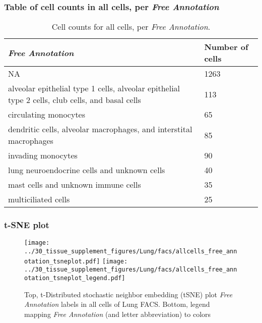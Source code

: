 \subsubsection{Table of cell counts in all cells, per \emph{Free Annotation}}\begin{table}[h]
\centering
\label{my-label}
\begin{tabular}{@{}ll@{}}
\toprule

\emph{Free Annotation}& Number of cells \\ \midrule
NA & 1263 \\

alveolar epithelial type 1 cells, alveolar epithelial type 2 cells, club cells, and basal cells & 113 \\

circulating monocytes & 65 \\

dendritic cells, alveolar macrophages, and interstital macrophages & 85 \\

invading monocytes & 90 \\

lung neuroendocrine cells and unknown cells & 40 \\

mast cells and unknown immune cells & 35 \\

multiciliated cells & 25 \\
\bottomrule
\end{tabular}
\caption{Cell counts for all cells, per \emph{Free Annotation}.}
\end{table}

\clearpage
\subsubsection{t-SNE plot}
\begin{figure}[h]
\centering
\texttt{[image: ../30\_tissue\_supplement\_figures/Lung/facs/allcells\_free\_annotation\_tsneplot.pdf]}
\texttt{[image: ../30\_tissue\_supplement\_figures/Lung/facs/allcells\_free\_annotation\_tsneplot\_legend.pdf]}
\caption{Top, t-Distributed stochastic neighbor embedding (tSNE) plot  \emph{Free Annotation} labels in all cells of Lung FACS. Bottom, legend mapping \emph{Free Annotation} (and letter abbreviation) to colors}
\end{figure}


\clearpage

